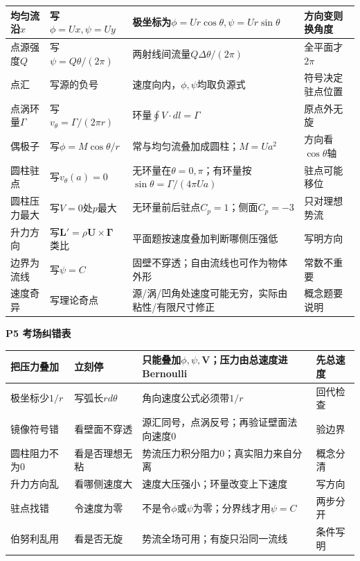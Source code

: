 \documentclass[UTF8,a4paper]{ctexart}
\newcommand{\ftitle}[1]{\vspace{1pt}\textbf{\textcolor{B}{#1}}\par\vspace{0.5pt}}
\begin{document}
\begin{tabular}{|L{0.19\textwidth}|L{0.23\textwidth}|L{0.34\textwidth}|L{0.19\textwidth}|}\hline
均匀流沿$x$ & 写$\phi=Ux,\psi=Uy$ & 极坐标为$\phi=Ur\cos\theta,\psi=Ur\sin\theta$ & 方向变则换角度 \\\hline
点源强度$Q$ & 写$\psi=Q\theta/(2\pi)$ & 两射线间流量$Q\Delta\theta/(2\pi)$ & 全平面才$2\pi$ \\\hline
点汇 & 写源的负号 & 速度向内，$\phi,\psi$均取负源式 & 符号决定驻点位置 \\\hline
点涡环量$\Gamma$ & 写$v_\theta=\Gamma/(2\pi r)$ & 环量$\oint V\cdot dl=\Gamma$ & 原点外无旋 \\\hline
偶极子 & 写$\phi=M\cos\theta/r$ & 常与均匀流叠加成圆柱；$M=Ua^2$ & 方向看$\cos\theta$轴 \\\hline
圆柱驻点 & 写$v_\theta(a)=0$ & 无环量在$\theta=0,\pi$；有环量按$\sin\theta=\Gamma/(4\pi Ua)$ & 驻点可能移位 \\\hline
圆柱压力最大 & 写$V=0$处$p$最大 & 无环量前后驻点$C_p=1$；侧面$C_p=-3$ & 只对理想势流 \\\hline
升力方向 & 写$\bm L'=\rho \bm U\times \bm\Gamma$类比 & 平面题按速度叠加判断哪侧压强低 & 写明方向 \\\hline
边界为流线 & 写$\psi=C$ & 固壁不穿透；自由流线也可作为物体外形 & 常数不重要 \\\hline
速度奇异 & 写理论奇点 & 源/涡/凹角处速度可能无穷，实际由粘性/有限尺寸修正 & 概念题要说明 \\\hline
\end{tabular}
\ftitle{P5 考场纠错表}
\begin{tabular}{|L{0.22\textwidth}|L{0.25\textwidth}|L{0.33\textwidth}|L{0.15\textwidth}|}\hline
把压力叠加 & 立刻停 & 只能叠加$\phi,\psi,\bm V$；压力由总速度进Bernoulli & 先总速度 \\\hline
极坐标少$1/r$ & 写弧长$r d\theta$ & 角向速度公式必须带$1/r$ & 回代检查 \\\hline
镜像符号错 & 看壁面不穿透 & 源汇同号，点涡反号；再验证壁面法向速度0 & 验边界 \\\hline
圆柱阻力不为0 & 看是否理想无粘 & 势流压力积分阻力0；真实阻力来自分离 & 概念分清 \\\hline
升力方向乱 & 看哪侧速度大 & 速度大压强小；环量改变上下速度 & 写方向 \\\hline
驻点找错 & 令速度为零 & 不是令$\phi$或$\psi$为零；分界线才用$\psi=C$ & 两步分开 \\\hline
伯努利乱用 & 看是否无旋 & 势流全场可用；有旋只沿同一流线 & 条件写明 \\\hline
\end{tabular}
\end{document}
